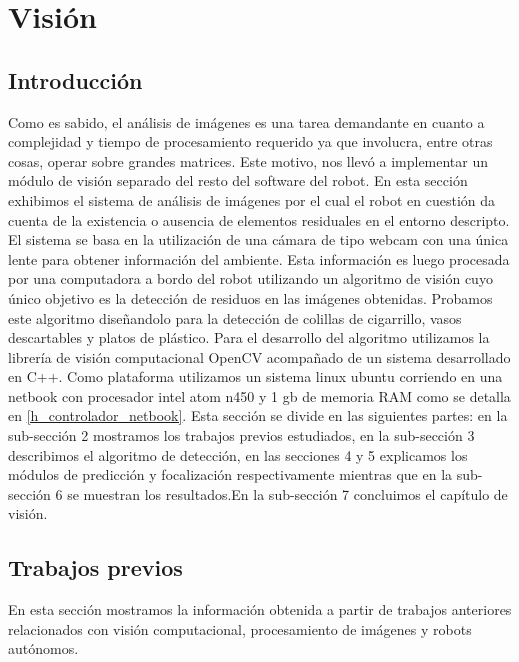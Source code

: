 ﻿\section{\label{sec:vision}Visi\'on}

\subsection{Introducci\'on}
Como es sabido, el an\'alisis de im\'agenes es una tarea demandante en cuanto a complejidad
y tiempo de procesamiento requerido ya que involucra, entre otras cosas, operar sobre grandes matrices. Este motivo, nos llev\'o a 
implementar un m\'odulo de visi\'on separado del resto del software del robot.
En esta secci\'on exhibimos el sistema de an\'alisis de im\'agenes por 
el cual el robot en cuesti\'on da cuenta de la existencia o ausencia de 
elementos residuales en el entorno descripto.  El sistema se basa en la 
utilizaci\'on de una c\'amara de tipo webcam con una \'unica lente para 
obtener informaci\'on del ambiente. Esta informaci\'on es luego procesada 
por una computadora a bordo del robot utilizando un algoritmo de visi\'on 
cuyo \'unico objetivo es la detecci\'on de residuos 
en las im\'agenes obtenidas. Probamos este algoritmo dise\~nandolo para la detecci\'on de 
colillas de cigarrillo, vasos descartables y platos de pl\'astico. Para 
el desarrollo del algoritmo utilizamos la librer\'ia de visi\'on 
computacional OpenCV \cite{opencv_library} acompa\~nado de un sistema 
desarrollado en C++. Como plataforma utilizamos un sistema linux 
ubuntu corriendo en una netbook con procesador intel atom 
n450 y 1 gb de memoria RAM como se detalla en \ref{h_controlador_netbook}.
Esta secci\'on se divide en las siguientes partes: en la sub-secci\'on 2 mostramos  
los trabajos previos estudiados, en la sub-secci\'on 3 describimos el algoritmo de detecci\'on, 
en las secciones 4 y 5 explicamos los m\'odulos de predicci\'on y focalizaci\'on respectivamente mientras que en la 
sub-secci\'on 6 se muestran los resultados.En la sub-secci\'on 7 concluimos 
el cap\'itulo de visi\'on.

\subsection{Trabajos previos}
En esta secci\'on mostramos la informaci\'on obtenida a partir de 
trabajos anteriores relacionados con visi\'on computacional, 
procesamiento de im\'agenes y robots aut\'onomos.
 
